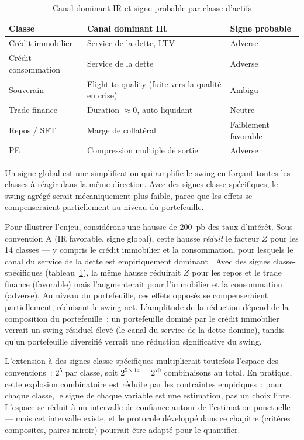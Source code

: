\documentclass[10pt, a4paper, oneside]{report}
\theoremstyle{definition}
\begin{document}
\begin{table}[htbp]
\centering
\caption{Canal dominant IR et signe probable par classe d'actifs}
\label{tab:signe-classe}
\small
\begin{tabular}{lll}
\toprule
Classe & Canal dominant IR & Signe probable \\
\midrule
Crédit immobilier & Service de la dette, LTV & Adverse \\
Crédit consommation & Service de la dette & Adverse \\
Souverain & Flight-to-quality (fuite vers la qualité en crise) & Ambigu \\
Trade finance & Duration $\approx 0$, auto-liquidant & Neutre \\
Repos / SFT & Marge de collatéral & Faiblement favorable \\
PE & Compression multiple de sortie & Adverse \\
\bottomrule
\end{tabular}
\end{table}

Un signe global est une simplification qui amplifie le swing en forçant toutes les classes à réagir dans la même direction. Avec des signes classe-spécifiques, le swing agrégé serait mécaniquement plus faible, parce que les effets se compenseraient partiellement au niveau du portefeuille.

Pour illustrer l'enjeu, considérons une hausse de 200~pb des taux d'intérêt. Sous convention A (IR favorable, signe global), cette hausse \emph{réduit} le facteur $Z$ pour les 14 classes --- y compris le crédit immobilier et la consommation, pour lesquels le canal du service de la dette est empiriquement dominant \citep{altavilla_boucinha_peydro2018}. Avec des signes classe-spécifiques (tableau~\ref{tab:signe-classe}), la même hausse réduirait $Z$ pour les repos et le trade finance (favorable) mais l'augmenterait pour l'immobilier et la consommation (adverse). Au niveau du portefeuille, ces effets opposés se compenseraient partiellement, réduisant le swing net. L'amplitude de la réduction dépend de la composition du portefeuille~: un portefeuille dominé par le crédit immobilier verrait un swing résiduel élevé (le canal du service de la dette domine), tandis qu'un portefeuille diversifié verrait une réduction significative du swing.

L'extension à des signes classe-spécifiques multiplierait toutefois l'espace des conventions~: $2^5$ par classe, soit $2^{5 \times 14} = 2^{70}$ combinaisons au total. En pratique, cette explosion combinatoire est réduite par les contraintes empiriques~: pour chaque classe, le signe de chaque variable est une estimation, pas un choix libre. L'espace se réduit à un intervalle de confiance autour de l'estimation ponctuelle --- mais cet intervalle existe, et le protocole développé dans ce chapitre (critères composites, paires miroir) pourrait être adapté pour le quantifier.
\end{document}
